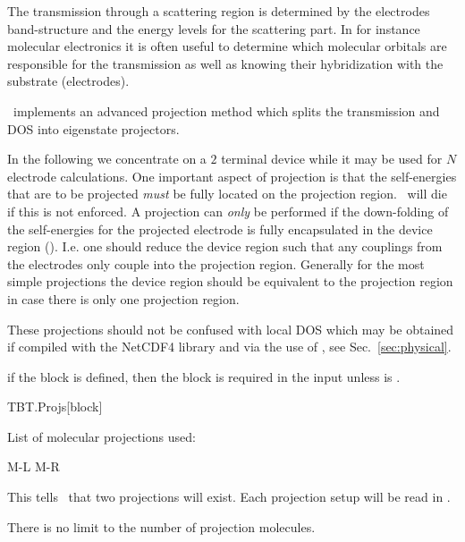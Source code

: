 The transmission through a scattering region is determined by the
electrodes band-structure and the energy levels for the scattering
part. In for instance molecular electronics it is often useful to
determine which molecular orbitals are responsible for the
transmission as well as knowing their hybridization with the substrate
(electrodes).

\tbtrans\ implements an advanced projection method which splits the
transmission and DOS into eigenstate projectors.

In the following we concentrate on a $2$ terminal device while it may
be used for $N$ electrode calculations. 
%
One important aspect of projection is that the self-energies that are
to be projected \emph{must} be fully located on the projection
region. \tbtrans\ will die if this is not enforced.
%
A projection can \emph{only} be performed if the down-folding of the
self-energies for the projected electrode is fully encapsulated in the
device region (). I.e. one should reduce the
device region such that any couplings from the electrodes only couple
into the projection region. Generally for the most simple projections
the device region should be equivalent to the projection region in
case there is only one projection region.

These projections should not be confused with local DOS which may be
obtained if compiled with the NetCDF4 library and via the use of
\sisl, see Sec.~\ref{sec:physical}.

\note if the  block is defined, then the
 block is required in the input unless
 is \fdftrue.


\begin{fdfentry}{TBT.Projs}[block]

  List of molecular projections used:
\begin{fdfexample}
    M-L
    M-R
\end{fdfexample}

  This tells \tbtrans\ that two projections will exist. Each
  projection setup will be read in .

  There is no limit to the number of projection molecules.
  
\end{fdfentry}

